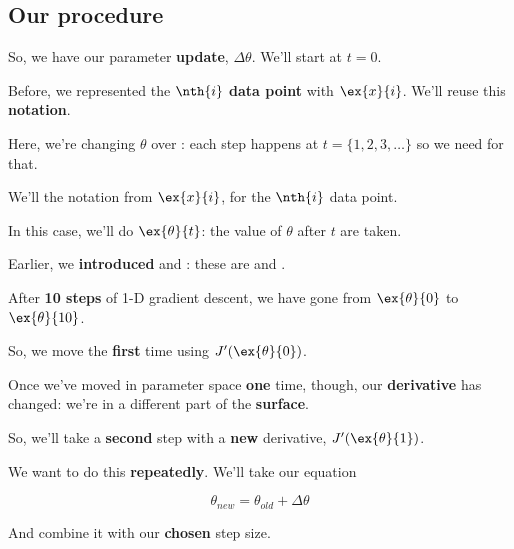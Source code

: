 \subsection*{Our procedure}

    So, we have our parameter \textbf{update}, $\Delta \theta$. We'll start at $t=0$.
    
    Before, we represented the $\nth{i}$ \textbf{data point} with $\ex{x}{i}$. We'll reuse this \textbf{notation}.\\
    
    \begin{notation}
        Here, we're changing $\theta$ over : each step happens at $t=\{1,2,3, \dots \}$ so we need  for that. 
        
        We'll  the notation from $\ex{x}{i}$, for the $\nth{i}$ data point.
        
        In this case, we'll do $\ex{\theta}{t}$: the value of $\theta$ after $t$  are taken.
        
        Earlier, we \textbf{introduced}  and : these are  and .
    \end{notation}
    
    \miniex After \textbf{10 steps} of 1-D gradient descent, we have gone from $\ex{\theta}{0}$ to $\ex{\theta}{10}$.
    
    So, we move the \textbf{first} time using $J'(\ex{\theta}{0})$.
    
    Once we've moved in parameter space \textbf{one} time, though, our \textbf{derivative} has changed: we're in a different part of the \textbf{surface}.
    
    So, we'll take a \textbf{second} step with a \textbf{new} derivative, $J'(\ex{\theta}{1})$.
    
    We want to do this \textbf{repeatedly}. We'll take our equation
    
    \begin{equation}
        \theta_{new} = \theta_{old} + \Delta \theta
    \end{equation}
    
    And combine it with our \textbf{chosen} step size.\\
    
